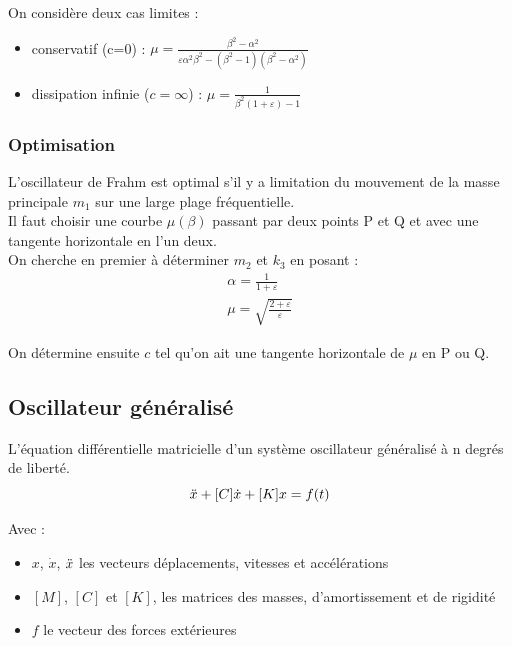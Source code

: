\documentclass[../main.tex]{subfiles}
\begin{document}
On considère deux cas limites : \begin{itemize}
    \item conservatif (c=0) : $\mu = \frac{\beta^2-\alpha^2}{\varepsilon\alpha^2\beta^2 - (\beta^2-1)(\beta^2-\alpha^2)}$\\
    \item dissipation infinie ($c=\infty$) : $\mu = \frac{1}{\beta^2(1+\varepsilon)-1}$\\
\end{itemize}

\subsubsection{Optimisation}
L'oscillateur de Frahm est optimal s'il y a limitation du mouvement de la masse principale $m_1$ sur une large plage fréquentielle.\\

Il faut choisir une courbe $\mu(\beta)$ passant par deux points P et Q et avec une tangente horizontale en l'un deux.\\

On cherche en premier à déterminer $m_2$ et $k_3$ en posant :\\ 
\begin{equation}
    \begin{gathered}
        \alpha = \frac{1}{1+\varepsilon}\\
        \mu = \sqrt{\frac{2+\varepsilon}{\varepsilon}}
    \end{gathered}
\end{equation}

On détermine ensuite $c$ tel qu'on ait une tangente horizontale de $\mu$ en P ou Q.\\

\subsection{Oscillateur généralisé}
L'équation différentielle matricielle d'un système oscillateur généralisé à n degrés de liberté. \\

\begin{equation}
    [M] \Ddot{x} + [C] \dot{x} + [K] x = f(t)
\end{equation}

Avec : \begin{itemize}
    \item $x$, $\dot{x}$, $\Ddot{x}$ les vecteurs déplacements, vitesses et accélérations\\
    \item $[M]$, $[C]$ et $[K]$, les matrices des masses, d'amortissement et de rigidité\\
    \item $f$ le vecteur des forces extérieures\\
\end{itemize}
\end{document}
